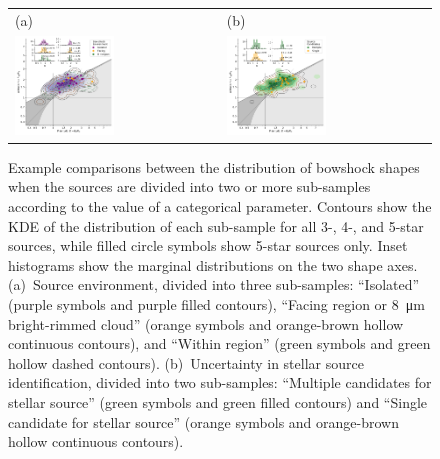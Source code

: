 \documentclass[useAMS, usenatbib, a4paper]{mnras}
\newcommand\hii{\ion{H}{ii}}
\begin{document}
\begin{figure}
  \setlength\tabcolsep{0pt}
  \begin{tabular}{ll}
    (a) & (b) \\
    \includegraphics[width=0.5\textwidth]{figs/mipsgal-Rc-R90-environment} &
    \includegraphics[width=0.5\textwidth]{figs/mipsgal-Rc-R90-candidates} 
  \end{tabular}
  \vspace*{-\baselineskip}
  \caption[]{Example comparisons between the distribution of bowshock
    shapes when the sources are divided into two or more sub-samples
    according to the value of a categorical parameter.  Contours show
    the KDE of the distribution of each sub-sample for all 3-, 4-, and
    5-star sources, while filled circle symbols show 5-star sources
    only. Inset histograms show the marginal distributions on the two
    shape axes. (a)~Source environment, divided into three
    sub-samples: ``Isolated'' (purple symbols and purple filled
    contours), ``Facing \hii{} region or \SI{8}{\um} bright-rimmed
    cloud'' (orange symbols and orange-brown hollow continuous
    contours), and ``Within \hii{} region'' (green symbols and green
    hollow dashed contours). (b)~Uncertainty in stellar source
    identification, divided into two sub-samples: ``Multiple
    candidates for stellar source'' (green symbols and green filled
    contours) and ``Single candidate for stellar source'' (orange
    symbols and orange-brown hollow continuous contours).}
  \label{fig:mipsgal-uncorrelated}
\end{figure}
\end{document}
